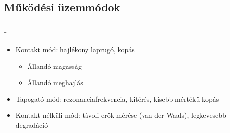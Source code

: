 \documentclass[aspectratio=169]{beamer}
\newcommand{\framet}{\frametitle{\secname{} - \subsecname}}
\begin{document}
\subsection{Működési üzemmódok}
\begin{frame}
\framet
\begin{itemize}
\item Kontakt mód: hajlékony laprugó, kopás
\begin{itemize}
\item Állandó magasság
\item Állandó meghajlás
\end{itemize}
\item Tapogató mód: rezonanciafrekvencia, kitérés, kisebb mértékű kopás
\item Kontakt nélküli mód: távoli erők mérése (van der Waals), legkevesebb degradáció
\end{itemize}
\end{frame}
\end{document}
